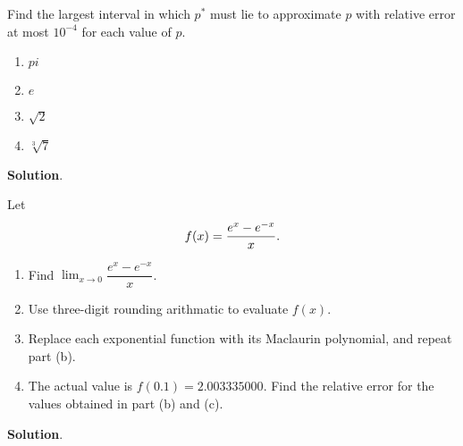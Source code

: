 \documentclass[11pt]{article}
\theoremstyle{break}
\numberwithin{equation}{theorem}
\begin{document}
\begin{problem}
    Find the largest interval in which $p^\ast$ must lie to approximate $p$ with relative error at most $10^{-4}$ for each value of $p$.
    \begin{enumerate}
        \item $pi$
        \item $e$
        \item $\sqrt{2}$
        \item $\sqrt[3]{7}$
    \end{enumerate}
\end{problem}
\textbf{Solution}.

\begin{problem}
    Let \vspace{-0.6em}
    \begin{equation*}
        f(x)=\dfrac{e^{x}-e^{-x}}{x}. \vspace{-0.6em}
    \end{equation*}
    \begin{enumerate}
        \item Find $\displaystyle\lim_{x\to 0}\dfrac{e^{x}-e^{-x}}{x}$.
        \item Use three-digit rounding arithmatic to evaluate $f(x)$.
        \item Replace each exponential function with its Maclaurin polynomial, and repeat part (b).
        \item The actual value is $f(0.1)=2.003335000$. Find the relative error for the values obtained in part (b) and (c).
    \end{enumerate}
\end{problem}
\textbf{Solution}.
\end{document}
